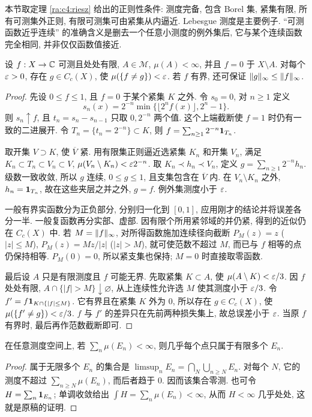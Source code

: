 本节取定理 \ref{ra:c4:riesz} 给出的正则性条件: 测度完备, 包含 Borel 集, 紧集有限, 所有可测集外正则, 有限可测集可由紧集从内逼近. Lebesgue 测度是主要例子. ``可测函数近乎连续'' 的准确含义是删去一个任意小测度的例外集后, 它与某个连续函数完全相同, 并非仅仅函数值接近.

\begin{theorem}[Lusin]\label{ra:c4:lusin}
设 $f:X\to\mathbb C$ 可测且处处有限, $A\in\mathcal M$, $\mu(A)<\infty$, 并且 $f=0$ 于 $X\setminus A$. 对每个 $\varepsilon>0$, 存在 $g\in C_c(X)$, 使 $\mu(\{f\ne g\})<\varepsilon$. 若 $f$ 有界, 还可保证 $\lVert g\rVert_\infty\le\lVert f\rVert_\infty$.
\end{theorem}
\begin{proof}
先设 $0\le f\le1$, 且 $f=0$ 于某个紧集 $K$ 之外. 令 $s_0=0$, 对 $n\ge1$ 定义
\[
 s_n(x)=2^{-n}\min\{\lfloor2^nf(x)\rfloor,2^n-1\}.
\]
则 $s_n\uparrow f$, 且 $t_n=s_n-s_{n-1}$ 只取 $0,2^{-n}$ 两个值. 这个上端截断使 $f=1$ 时仍有一致的二进展开. 令 $T_n=\{t_n=2^{-n}\}\subset K$, 则 $f=\sum_{n\ge1}2^{-n}\mathbf 1_{T_n}$.

取开集 $V\supset K$, 使 $\overline V$ 紧. 用有限集正则逼近选紧集 $K_n$ 和开集 $V_n$, 满足 $K_n\subset T_n\subset V_n\subset V$, $\mu(V_n\setminus K_n)<\varepsilon2^{-n}$. 取 $K_n\prec h_n\prec V_n$, 定义 $g=\sum_{n\ge1}2^{-n}h_n$. 级数一致收敛, 所以 $g$ 连续, $0\le g\le1$, 且支集包含在 $\overline V$ 内. 在 $V_n\setminus K_n$ 之外, $h_n=\mathbf 1_{T_n}$, 故在这些夹层之并之外, $g=f$. 例外集测度小于 $\varepsilon$.

一般有界实函数分为正负部分, 分别归一化到 $[0,1]$, 应用刚才的结论并将误差各分一半. 一般复函数再分实部、虚部. 因有限个所用紧邻域的并仍紧, 得到的近似仍在 $C_c(X)$ 中. 若 $M=\lVert f\rVert_\infty$, 对所得函数施加连续径向截断 $P_M(z)=z$ ($|z|\le M$), $P_M(z)=Mz/|z|$ ($|z|>M$), 就可使范数不超过 $M$, 而已与 $f$ 相等的点仍保持相等. $P_M(0)=0$, 所以紧支集也保持; $M=0$ 时直接取零函数.

最后设 $A$ 只是有限测度且 $f$ 可能无界. 先取紧集 $K\subset A$, 使 $\mu(A\setminus K)<\varepsilon/3$. 因 $f$ 处处有限, $A\cap\{|f|>M\}\downarrow\varnothing$, 从上连续性允许选 $M$ 使其测度小于 $\varepsilon/3$. 令 $f'=f\mathbf 1_{K\cap\{|f|\le M\}}$. 它有界且在紧集 $K$ 外为 $0$, 所以存在 $g\in C_c(X)$, 使 $\mu(\{f'\ne g\})<\varepsilon/3$. $f$ 与 $f'$ 的差异只在先前两种损失集上, 故总误差小于 $\varepsilon$. 当原 $f$ 有界时, 最后再作范数截断即可.
\end{proof}

\begin{lemma}[可求和例外集]\label{ra:c4:bc}
在任意测度空间上, 若 $\sum_n\mu(E_n)<\infty$, 则几乎每个点只属于有限多个 $E_n$.
\end{lemma}
\begin{proof}
属于无限多个 $E_n$ 的集合是 $\limsup_nE_n=\bigcap_N\bigcup_{n\ge N}E_n$. 对每个 $N$, 它的测度不超过 $\sum_{n\ge N}\mu(E_n)$, 而后者趋于 $0$. 因而该集合零测. 也可令 $H=\sum_n\mathbf 1_{E_n}$; 单调收敛给出 $\int H=\sum_n\mu(E_n)<\infty$, 从而 $H<\infty$ 几乎处处, 这就是原稿的证明.
\end{proof}

